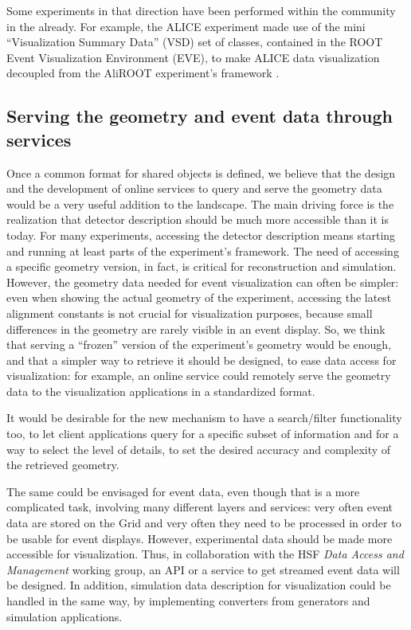 \documentclass[12pt,a4paper]{article}
\begin{document}
Some experiments in that direction have been performed within the community in the already. For example, the
ALICE experiment made use of the mini ``Visualization Summary Data'' (VSD) set of classes, contained in the ROOT Event
Visualization Environment (EVE), to make ALICE data visualization decoupled from the AliROOT experiment’s framework \cite{TadelALICE}.

\hypertarget{serving-data}{%
\subsection{Serving the geometry and event data through services}\label{serving-data}}

Once a common format for shared objects is defined, we believe that the design and the development of online services to query and serve the geometry
data would be a very useful addition to the landscape. %
The main driving force is the realization that detector description should be much more accessible than it is today.
For many experiments, accessing the detector description means starting and running at least parts of the experiment’s framework. The need of accessing a specific geometry version, in fact, is critical for reconstruction and simulation. However, the geometry
data needed for event visualization can often be simpler: even when showing the actual geometry of the experiment, accessing the latest
alignment constants is not crucial for visualization purposes, because small differences in the geometry are rarely visible in an event display.
So, we think that serving a “frozen” version of the experiment’s geometry would be enough, and that a simpler way to retrieve it
should be designed, to ease data access for visualization: for example, an online service could remotely serve the geometry data to the visualization applications in a standardized format.

It would be desirable for the new mechanism to have a search/filter functionality too, to let client applications query for a specific
subset of information and for a way to select the level of details, to set the desired accuracy and complexity of the retrieved geometry.

The same could be envisaged for event data, even though that is a more complicated task, involving many different layers and services:
very often event data are stored on the Grid and very often they need to be processed in order to be usable for event displays.
However, experimental data should be made more accessible for visualization. Thus, in collaboration with
the HSF \textit{Data Access and Management} working group, an API or a service to get streamed event data will be designed.
In addition, simulation data description for visualization could be handled in the same way, by implementing converters from
generators and simulation applications.
\end{document}
